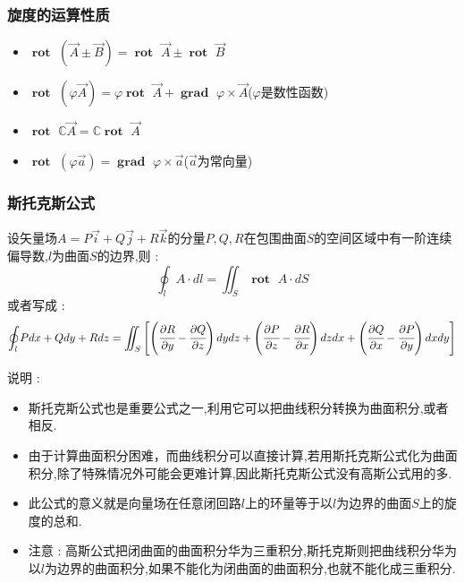 \documentclass[UTF8,12pt]{ctexbook}
\newcommand{\mathConstant}{\mathbb{C}}
\newcommand{\bigCase}[1]{\left(#1\right)}
\newcommand{\partialDerivativeFrac}[2]{\cfrac{\partial #1}{\partial #2}}
\newcommand{\mediumBigCase}[1]{\left[#1\right]}
\newcommand{\curveIntegralOnLine}[1]{\oint_{#1}}
\newcommand{\surfaceIntegralOnSurface}[1]{\iint_{#1}}
\DeclareMathOperator{\curlRotText}{\mathbf{rot}\ }
\DeclareMathOperator{\gradText}{\mathbf{grad}\ }
\begin{document}
{{{{    \subsubsection{旋度的运算性质}{
      \begin{itemize}
        \item $\curlRotText (\vec{A} \pm \vec{B}) = \curlRotText \vec{A} \pm \curlRotText \vec{B}$
        \item $\curlRotText (\varphi \vec{A}) = \varphi \curlRotText \vec{A} + \gradText \varphi \times \vec{A}$($\varphi$是数性函数)
        \item $\curlRotText \mathConstant \vec{A} = \mathConstant \curlRotText \vec{A}$
        \item $\curlRotText (\varphi \vec{a}) = \gradText \varphi \times \vec{a}$($\vec{a}$为常向量)
      \end{itemize}
    }%

    \subsubsection{斯托克斯公式}{
      设矢量场$A = P\vec{i} + Q\vec{j} + R\vec{k}$的分量$P,Q,R$在包围曲面$S$的空间区域中有一阶连续偏导数,$l$为曲面$S$的边界,则 : $$
        \curveIntegralOnLine{l}A \cdot dl = \surfaceIntegralOnSurface{S}\curlRotText A\cdot dS
      $$
      或者写成 : $$
        \curveIntegralOnLine{l}Pdx + Qdy + Rdz = \surfaceIntegralOnSurface{S}\mediumBigCase{\bigCase{\partialDerivativeFrac{R}{y} - \partialDerivativeFrac{Q}{z}}dydz + \bigCase{\partialDerivativeFrac{P}{z} - \partialDerivativeFrac{R}{x}}dzdx + \bigCase{\partialDerivativeFrac{Q}{x} - \partialDerivativeFrac{P}{y}}dxdy}
      $$

      说明 :
      \begin{itemize}
        \item 斯托克斯公式也是重要公式之一,利用它可以把曲线积分转换为曲面积分,或者相反.
        \item 由于计算曲面积分困难，而曲线积分可以直接计算,若用斯托克斯公式化为曲面积分,除了特殊情况外可能会更难计算,因此斯托克斯公式没有高斯公式用的多.
        \item 此公式的意义就是向量场在任意闭回路$l$上的环量等于以$l$为边界的曲面$S$上的旋度的总和.
        \item 注意 : 高斯公式把闭曲面的曲面积分华为三重积分,斯托克斯则把曲线积分华为以$l$为边界的曲面积分,如果不能化为闭曲面的曲面积分,也就不能化成三重积分.
      \end{itemize}

}}}}}
\end{document}
